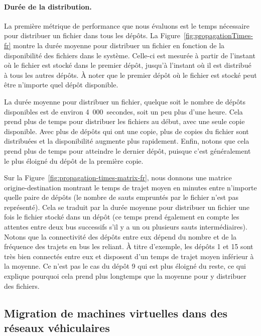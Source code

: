 \paragraph{Durée de la distribution.} La première métrique de performance que nous évaluons est le temps nécessaire pour distribuer un fichier dans tous les dépôts. La Figure~\ref{fig:propagationTimes-fr} montre la durée moyenne pour distribuer un fichier en fonction de la disponibilité des fichiers dans le système. Celle-ci est mesurée à partir de l’instant où le fichier est stocké dans le premier dépôt, jusqu’à l’instant où il est distribué à tous les autres dépôts. À noter que le premier dépôt où le fichier est stocké peut être n’importe quel dépôt disponible. 
 
La durée moyenne pour distribuer un fichier, quelque soit le nombre de dépôts disponibles est de environ 4~000~secondes, soit un peu plus d’une heure. Cela prend plus de temps pour distribuer les fichiers au début, avec une seule copie disponible. Avec plus de dépôts qui ont une copie, plus de copies du fichier sont distribuées et la disponibilité augmente plus rapidement. Enfin, notons que cela prend plus de temps pour atteindre le dernier dépôt, puisque c’est généralement le plus éloigné du dépôt de la première copie. 
 
 
Sur la Figure~\ref{fig:propagation-times-matrix-fr}, nous donnons une matrice origine-destination montrant le temps de trajet moyen en minutes entre n’importe quelle paire de dépôts (le nombre de sauts empruntés par le fichier n’est pas représenté). Cela se traduit par la durée moyenne pour distribuer un fichier une fois le fichier stocké dans un dépôt (ce temps prend également en compte les attentes entre deux bus successifs s’il y a un ou plusieurs sauts intermédiaires). Notons que la connectivité des dépôts entre eux dépend du nombre et de la fréquence des trajets en bus les reliant. À titre d’exemple, les dépôts 1 et 15 sont très bien connectés entre eux et disposent d’un temps de trajet moyen inférieur à la moyenne. Ce n’est pas le cas du dépôt 9 qui est plus éloigné du reste, ce qui explique pourquoi cela prend plus longtemps que la moyenne pour y distribuer des fichiers.  
 
 
 
 
\subsection{Migration de machines virtuelles dans des réseaux véhiculaires} 
 
